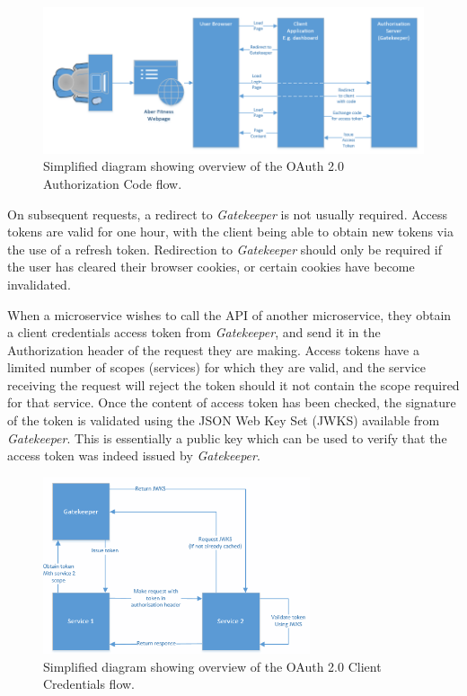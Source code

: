 \begin{figure}[H]
    \centering
    \includegraphics[width=\textwidth]{Images/gatekeeper_authcode_flow.png}
    \caption{Simplified diagram showing overview of the OAuth 2.0 Authorization Code flow.}
\end{figure}

On subsequent requests, a redirect to \textit{Gatekeeper} is not usually required. Access tokens are valid for one hour, with the client being able to obtain new tokens via the use of a refresh token. Redirection to \textit{Gatekeeper} should only be required if the user has cleared their browser cookies, or certain cookies have become invalidated.

When a microservice wishes to call the API of another microservice, they obtain a client credentials access token from \textit{Gatekeeper}, and send it in the Authorization header of the request they are making. Access tokens have a limited number of scopes (services) for which they are valid, and the service receiving the request will reject the token should it not contain the scope required for that service. Once the content of access token has been checked, the signature of the token is validated using the JSON Web Key Set (JWKS) available from \textit{Gatekeeper}. This is essentially a public key which can be used to verify that the access token was indeed issued by \textit{Gatekeeper}.

\begin{figure}[H]
    \centering
    \includegraphics[width=0.7\textwidth]{Images/gatekeeper_clientcredentials_flow.png}
    \caption{Simplified diagram showing overview of the OAuth 2.0 Client Credentials flow.}
\end{figure}

